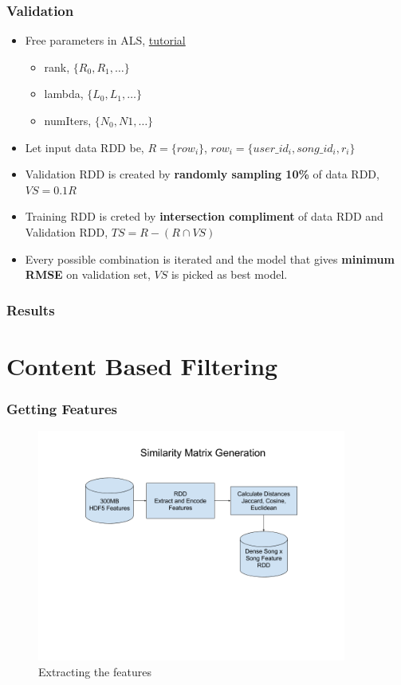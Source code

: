 \documentclass[11pt]{beamer}
\begin{document}
\begin{frame}
  \frametitle{Validation}
  \begin{itemize}
    \item Free parameters in ALS, \href{'http://spark.apache.org/docs/latest/mllib-collaborative-filtering.html'}{tutorial}
      \begin{itemize}
        \item rank, $\{R_0,R_1,\dots\}$
        \item lambda, $\{L_0,L_1,\dots\}$
        \item numIters, $\{N_0,N1,\dots\}$
      \end{itemize}
    \item Let input data RDD be, $R = \{row_i\}$, $row_i = \{user\_id_i, song\_id_i, r_i\}$
    \item Validation RDD is created by {\bf randomly sampling 10\%} of data RDD, $VS = 0.1R$
      \item Training RDD is creted by {\bf intersection compliment} of data RDD and Validation RDD,
        $TS = R - (R \cap VS)$
      \item Every possible combination is iterated and the model that gives {\bf minimum RMSE} on
        validation set, $VS$ is picked as best model.
    \end{itemize}
  \end{frame}
  \begin{frame}
    \frametitle{Results}
  \end{frame}


  \section{Content Based Filtering}
  \begin{frame}
    \frametitle{Getting Features}
    \begin{figure}[h]
      \centering
      \includegraphics[width=4in]{figures/similarity_matrix.png}
      \caption{Extracting the features}
      \label{fig:similarity_matrix}
    \end{figure}
  \end{frame}
\end{document}
